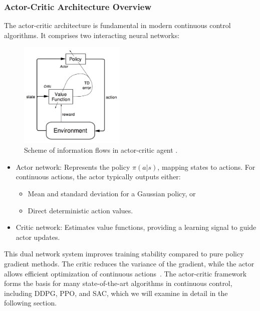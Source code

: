 \subsubsection{Actor-Critic Architecture Overview}

The actor-critic architecture is fundamental in modern continuous control algorithms. It comprises two interacting neural networks:

\begin{figure}[H] %
    \centering
    \includegraphics[width=0.45\textwidth]{actorcritic.png} %
    \caption{Scheme of information flows in actor-critic agent \cite{Sutton2018}.}
    \label{fig:mdp}
\end{figure}

\begin{itemize}
    \item Actor network: Represents the policy $\pi(a|s)$, mapping states to actions. For continuous actions, the actor typically outputs either: \begin{itemize}
        \item Mean and standard deviation for a Gaussian policy, or
        \item Direct deterministic action values.
    \end{itemize}
    \item Critic network: Estimates value functions, providing a learning signal to guide actor updates.
\end{itemize}

\noindent This dual network system improves training stability compared to pure policy gradient methods. The critic reduces the variance of the gradient, while the actor allows efficient optimization of continuous actions~\cite{Sutton2018}. The actor-critic framework forms the basis for many state-of-the-art algorithms in continuous control, including \gls{DDPG}, \gls{PPO}, and \gls{SAC}, which we will examine in detail in the following section.
